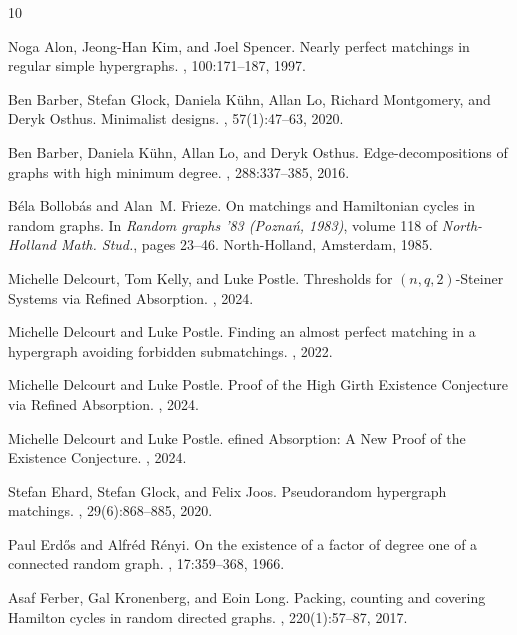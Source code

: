 \documentclass[11pt]{article}
\numberwithin{equation}{section}
\newcounter{i}
\theoremstyle{plain}
\theoremstyle{plain} %
\theoremstyle{definition}
\begin{document}
\begin{thebibliography}{10}

Noga Alon, Jeong-Han Kim, and Joel Spencer.
\newblock Nearly perfect matchings in regular simple hypergraphs.
, 100:171--187, 1997.

Ben Barber, Stefan Glock, Daniela K\"{u}hn, Allan Lo, Richard Montgomery, and
  Deryk Osthus.
\newblock Minimalist designs.
, 57(1):47--63, 2020.

Ben Barber, Daniela K\"{u}hn, Allan Lo, and Deryk Osthus.
\newblock Edge-decompositions of graphs with high minimum degree.
, 288:337--385, 2016.

B\'{e}la Bollob\'{a}s and Alan~M. Frieze.
\newblock On matchings and {H}amiltonian cycles in random graphs.
\newblock In {\em Random graphs '83 ({P}ozna\'{n}, 1983)}, volume 118 of {\em
  North-Holland Math. Stud.}, pages 23--46. North-Holland, Amsterdam, 1985.

Michelle Delcourt, Tom Kelly, and Luke Postle.
\newblock Thresholds for $(n,q,2)$-{S}teiner {S}ystems via {R}efined
  {A}bsorption.
, 2024.

Michelle Delcourt and Luke Postle.
\newblock Finding an almost perfect matching in a hypergraph avoiding forbidden
  submatchings.
, 2022.

Michelle Delcourt and Luke Postle.
\newblock Proof of the {H}igh {G}irth {E}xistence {C}onjecture via {R}efined
  {A}bsorption.
, 2024.

Michelle Delcourt and Luke Postle.
efined {A}bsorption: {A} {N}ew {P}roof of the {E}xistence
  {C}onjecture.
, 2024.

Stefan Ehard, Stefan Glock, and Felix Joos.
\newblock Pseudorandom hypergraph matchings.
, 29(6):868--885, 2020.

Paul Erd\H{o}s and Alfr\'{e}d R\'{e}nyi.
\newblock On the existence of a factor of degree one of a connected random
  graph.
, 17:359--368, 1966.

Asaf Ferber, Gal Kronenberg, and Eoin Long.
\newblock Packing, counting and covering {H}amilton cycles in random directed
  graphs.
, 220(1):57--87, 2017.


\end{thebibliography}
\end{document}
